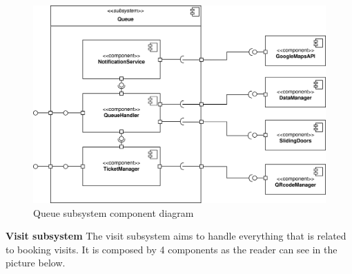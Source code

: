 \documentclass[]{article}
\begin{document}
	\bigskip
	\begin{figure}[H]
			\centering
			\includegraphics[scale=0.9]{ComponentView/queueComponent.png}
			\caption{Queue subsystem component diagram}
			\label{fig:Queuediagram}
		\end{figure}
		\bigskip\bigskip
		
	\newpage
	\noindent
	\textbf{Visit subsystem}
	\medskip \newline
	The visit subsystem aims to handle everything that is related to booking visits. It is composed by 4 components as the reader can see in the picture below. 
	\bigskip
	
\end{document}
